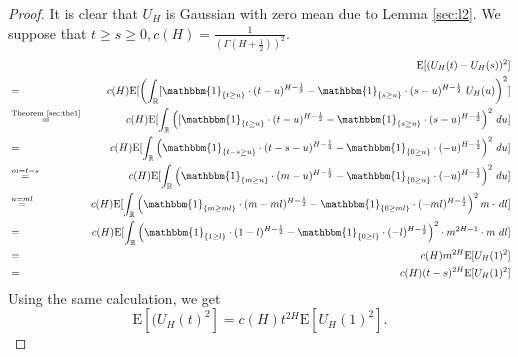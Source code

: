 \documentclass[a4paper, twoside, 11pt]{article}
\theoremstyle{definition}
\newcommand{\brkt}[1]{\left({#1} \right)}
\begin{document}
\begin{proof}
  It is clear that $U_H$ is Gaussian with zero mean due to Lemma \ref{sec:l2}. We suppose that $t \ge s \ge 0,  c(H)=\frac{1}{(\Gamma(H+\frac{1}{2}))^2}$.
  \begin{eqnarray}
	&&\mathrm{E}[(U_H(t) - U_H(s))^2]\\
	&=& c(H)\mathrm{E}[\brkt{\int_{\mathbb{R}} [\mathbbm{1}_{\{t\ge u\}}\cdot(t-u)^{H-\frac{1}{2}}  - \mathbbm{1}_{\{s\ge u\}}\cdot(s-u)^{H-\frac{1}{2}} \,\mathop{U_H(u)}}^2]\nonumber\\
	&\overset{\text{Theorem \ref{sec:the1}}}{=}& c(H)\mathrm{E}[\int_{\mathbb{R}} \brkt{[\mathbbm{1}_{\{t\ge u\}}\cdot(t-u)^{H-\frac{1}{2}}  - \mathbbm{1}_{\{s\ge u\}}\cdot(s-u)^{H-\frac{1}{2}}}^2 \,\mathop{du}]\nonumber\\
	&=& c(H)\mathrm{E}[\int_{\mathbb{R}} \brkt{\mathbbm{1}_{\{t-s \ge u\}}\cdot(t-s-u)^{H-\frac{1}{2}}  - \mathbbm{1}_{\{0\ge u\}}\cdot(-u)^{H-\frac{1}{2}}}^2 \,\mathop{du}]\nonumber\\
	&\overset{m=t-s}{=}& c(H)\mathrm{E}[\int_{\mathbb{R}} \brkt{\mathbbm{1}_{\{m \ge u\}}\cdot(m-u)^{H-\frac{1}{2}}  - \mathbbm{1}_{\{0\ge u\}}\cdot(-u)^{H-\frac{1}{2}}}^2 \,\mathop{du}]\nonumber\\
	&\overset{u=ml}{=}& c(H)\mathrm{E}[\int_{\mathbb{R}} \brkt{\mathbbm{1}_{\{m \ge ml\}}\cdot(m-ml)^{H-\frac{1}{2}}  - \mathbbm{1}_{\{0\ge ml\}}\cdot(-ml)^{H-\frac{1}{2}}}^2 m\cdot\,\mathop{dl}]\nonumber\\
	&=& c(H)\mathrm{E}[\int_{\mathbb{R}} \brkt{\mathbbm{1}_{\{1 \ge l \}}\cdot(1-l)^{H-\frac{1}{2}}  - \mathbbm{1}_{\{0\ge l\}}\cdot(-l)^{H-\frac{1}{2}}}^2 \cdot m^{2H-1}\cdot m\,\mathop{dl}]\nonumber\\
	&=& c(H)m^{2H}\mathrm{E}[U_H(1)^2]\nonumber\\
	&=& c(H)(t-s)^{2H}\mathrm{E}[U_H(1)^2]
	\label{sec:eqn1}
  \end{eqnarray}
  Using the same calculation, we get
  \begin{equation}
	\mathrm{E}[(U_H(t)^2] = c(H)t^{2H}\mathrm{E}[U_H(1)^2].
	\label{sec:eqn2}
  \end{equation}


\end{proof}
\end{document}
